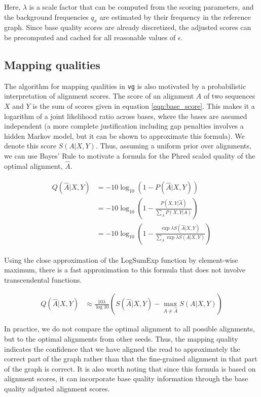 Here, $\lambda$ is a scale factor that can be computed from the scoring parameters, and the background frequencies $q_x$ are estimated by their frequency in the reference graph. Since base quality scores are already discretized, the adjusted scores can be precomputed and cached for all reasonable values of $\epsilon$. 

\subsection{Mapping qualities}

The algorithm for mapping qualities in {\tt vg} is also motivated by a probabilistic interpretation of alignment scores.
The score of an alignment $A$ of two sequences $X$ and $Y$ is the sum of scores given in equation \ref{eqn:base_score}.
This makes it a logarithm of a joint likelihood ratio across bases, where the bases are assumed independent (a more complete justification including gap penalties involves a hidden Markov model, but it can be shown to approximate this formula).
We denote this score $S(A|X,Y)$.
Thus, assuming a uniform prior over alignments, we can use Bayes' Rule to motivate a formula for the Phred scaled quality of the optimal alignment, $\hat A$.

\begin{align}
\begin{split}
    Q(\hat A|X,Y) &= -10\log_{10}(1 - P(\hat A|X,Y)) \\
    &= -10 \log_{10}\left(1 - \frac{P(X,Y|\hat A)}{\sum_{A}P(X,Y|A)} \right) \\
    &= -10 \log_{10}\left(1 - \frac{\exp \lambda S(\hat A|X,Y)}{\sum_{A}\exp \lambda S(A|X,Y)} \right) \label{basicqualityscore}
\end{split}
\end{align}

Using the close approximation of the LogSumExp function by element-wise maximum, there is a fast approximation to this formula that does not involve transcendental functions.

\begin{align}
    Q(\hat A|X,Y) &\approx \frac{10\lambda}{\log 10}\left( S(\hat A | X,Y) - \max_{A \neq \hat A}S(A| X,Y)\right)
\end{align}

In practice, we do not compare the optimal alignment to all possible alignments, but to the optimal alignments from other seeds. Thus, the mapping quality indicates the confidence that we have aligned the read to approximately the correct part of the graph rather than that the fine-grained alignment in that part of the graph is correct. It is also worth noting that since this formula is based on alignment scores, it can incorporate base quality information through the base quality adjusted alignment scores.


